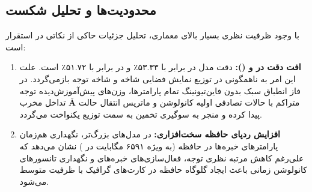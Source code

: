 \subsection{محدودیت‌ها و تحلیل شکست}
با وجود ظرفیت نظری بسیار بالای معماری، تحلیل جزئیات حاکی از نکاتی در استقرار است:
\begin{enumerate}
    \item \textbf{افت دقت در  و  ():} دقت مدل در  برابر با ۵۳.۳۳٪ و در  برابر با ۵۱.۷۲٪ است. علت این امر به ناهمگونی در توزیع نمایش فضایی شاخه  و شاخه توجه بازمی‌گردد. در فاز انطباق سبک بدون فاین‌تیونینگ تمام پارامترها، وزن‌های پیش‌آموزش‌دیده توجه متراکم با حالات تصادفی اولیه کانولوشن و ماتریس انتقال حالت $\bar{\mathbf{A}}$ تداخل مخرب پیدا کرده و منجر به سوگیری تخمین به سمت توزیع یکنواخت می‌گردد.
    \item \textbf{افزایش ردپای حافظه سخت‌افزاری:} در مدل‌های بزرگ‌تر، نگهداری هم‌زمان پارامترهای خبره‌ها در حافظه  (به ویژه ۶۵۹۱ مگابایت در ) نشان می‌دهد که علی‌رغم کاهش مرتبه نظری توجه، فعال‌سازی‌های خبره‌های  و نگهداری تانسورهای کانولوشن زمانی باعث ایجاد گلوگاه حافظه در کارت‌های گرافیک با ظرفیت متوسط می‌شود.
\end{enumerate}

